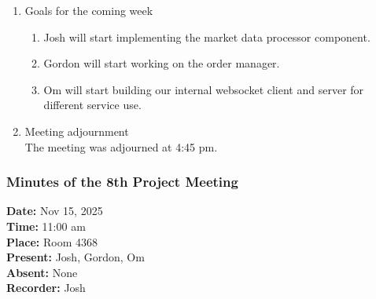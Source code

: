 \documentclass[12pt,a4paper]{article}
\begin{document}
\begin{enumerate}
\begin{enumerate}
\end{enumerate}
\item Goals for the coming week
\begin{enumerate}
\item Josh will start implementing the market data processor component.\\
\item Gordon will start working on the order manager.\\
\item Om will start building our internal websocket client and server for different service use.\\
\end{enumerate}
\item Meeting adjournment\\
The meeting was adjourned at 4:45 pm.
\end{enumerate}

\subsubsection{Minutes of the 8th Project Meeting}
\textbf{Date:} Nov 15, 2025\\
\textbf{Time:} 11:00 am\\
\textbf{Place:} Room 4368\\
\textbf{Present:} Josh, Gordon, Om\\
\textbf{Absent:} None\\
\textbf{Recorder:} Josh
\end{document}
